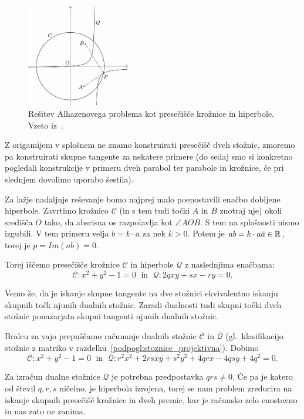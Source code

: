 \begin{figure}[h]
    \centering
    \includegraphics[width=0.4\textwidth]{images/alhazen/huygens2.png}
    \caption[Huygensova rešitev]{Rešitev Alhazenovega problema kot presečišče krožnice in hiperbole. Vzeto iz~\cite[str.\ 39]{nishimura2018}.}
    \label{fig:huygens2}
\end{figure} 

Z origamijem v splošnem ne znamo konstruirati presečišč dveh stožnic, zmoremo pa konstruirati skupne tangente za nekatere primere (do sedaj smo si konkretno pogledali konstrukcije v primeru dveh parabol ter parabole in krožnice, če pri slednjem dovolimo uporabo šestila).

Za lažje nadaljnje reševanje bomo najprej malo poenostavili enačbo dobljene hiperbole. Zavrtimo krožnico $\mathcal{C}$ (in s tem tudi točki $A$ in $B$ znotraj nje) okoli središča $O$ tako, da abscisna os razpolavlja kot $\angle AOB$. S tem na splošnosti nismo izgubili. V tem primeru velja $b = k \cdot \overline{a}$ za nek $k > 0$. Potem je $ab = k \cdot a \overline{a} \in \mathbb R$, torej je $p = Im(ab) = 0$.

Torej iščemo presečišče krožnice $\mathcal{C}$ in hiperbole $\mathcal{Q}$ z naslednjima enačbama:
$$ \mathcal{C}: x^2 + y^2 - 1 = 0 \; \text{ in } \; \mathcal{Q}: 2qxy + sx - ry = 0. $$

Vemo že, da je iskanje skupne tangente na dve stožnici ekvivalentno iskanju skupnih točk njunih dualnih stožnic. Zaradi dualnosti tudi skupni točki dveh stožnic ponazarjata skupni tangenti njunih dualnih stožnic.

Bralcu za vajo prepuščamo računanje dualnih stožnic $\mathcal{\overline{C}}$ in $\mathcal{\overline{Q}}$ (gl.\ klasifikacijo stožnic z matriko v razdelku~\ref{podpogl:stoznice_projektivna}). Dobimo
$$ \mathcal{\overline{C}}: x^2 + y^2 - 1 = 0 \; \text{ in } \; \mathcal{\overline{Q}}: r^2x^2 + 2rsxy + s^2y^2 + 4qrx - 4qsy + 4q^2 = 0. $$

\begin{opomba}
    Za izračun dualne stožnice $\mathcal{\overline{Q}}$ je potrebna predpostavka $qrs \neq 0$. Če pa je katero od števil $q, r, s$ ničelno, je hiperbola izrojena, torej se nam problem zreducira na iskanje skupnih presečišč krožnice in dveh premic, kar je računsko zelo enostavno in nas zato ne zanima.
\end{opomba}

